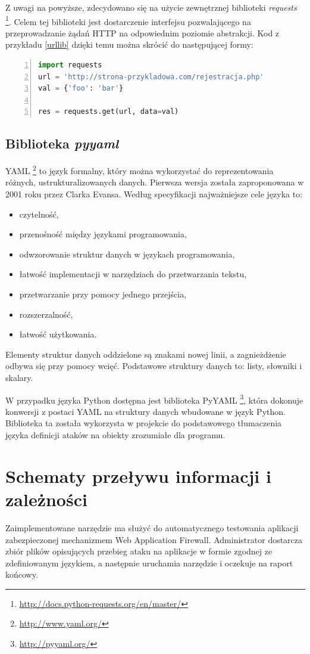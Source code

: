 \documentclass[11pt,a4paper,polish,thesis]{dcsbook}
\begin{document}
Z uwagi na powyższe, zdecydowano się na użycie zewnętrznej biblioteki \textit{requests} \footnote{\url{http://docs.python-requests.org/en/master/}}. Celem tej biblioteki jest dostarczenie interfejsu pozwalającego na przeprowadzanie żądań HTTP na odpowiednim poziomie abstrakcji. Kod z przykładu \ref{urllib} dzięki temu można skrócić do następującej formy:
\begin{lstlisting}[language=python,frame=single,label=req1,numbers=left]
import requests
url = 'http://strona-przykladowa.com/rejestracja.php'
val = {'foo': 'bar'}

res = requests.get(url, data=val)
\end{lstlisting}

\subsection{Biblioteka \textit{pyyaml}}
YAML \footnote{\url{http://www.yaml.org/}} to język formalny, który można wykorzystać do reprezentowania różnych, ustrukturalizowanych danych. Pierwsza wersja została zaproponowana w 2001 roku przez Clarka Evansa. Według specyfikacji \cite{yamlspec} najważniejsze cele języka to: 
\begin{itemize}
\item czytelność,
\item przenośność między językami programowania,
\item odwzorowanie struktur danych w językach programowania,
\item łatwość implementacji w narzędziach do przetwarzania tekstu,
\item przetwarzanie przy pomocy jednego przejścia,
\item rozszerzalność,
\item łatwość użytkowania.
\end{itemize}

Elementy struktur danych oddzielone są znakami nowej linii, a zagnieżdżenie odbywa się przy pomocy wcięć. Podstawowe struktury danych to: listy, słowniki i skalary.

W przypadku języka Python dostępna jest biblioteka PyYAML \footnote{\url{http://pyyaml.org/}}, która dokonuje konwersji z postaci YAML na struktury danych wbudowane w język Python. Biblioteka ta została wykorzysta w projekcie do podstawowego tłumaczenia języka definicji ataków na obiekty zrozumiałe dla programu.

\section{Schematy przeływu informacji i zależności}
Zaimplementowane narzędzie ma służyć do automatycznego testowania aplikacji zabezpieczonej mechanizmem Web Application Firewall. Administrator dostarcza zbiór plików opisujących przebieg ataku na aplikacje w formie zgodnej ze zdefiniowanym językiem, a następnie uruchamia narzędzie i oczekuje na raport końcowy.
\end{document}
